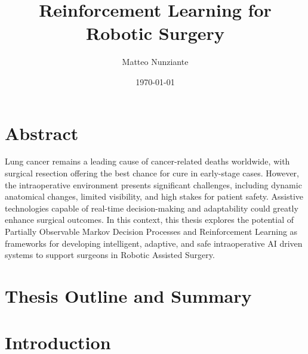 \documentclass[a4paper,11pt]{report}
\title{\textbf{Reinforcement Learning for Robotic Surgery}}
\author{Matteo Nunziante}
\date{\today}
\theoremstyle{definition}
\theoremstyle{plain}
\theoremstyle{remark}  %
\begin{document}
\setlength{\parindent}{0pt}

\maketitle

\chapter*{Abstract}
Lung cancer remains a leading cause of cancer-related deaths worldwide, with surgical
resection offering the best chance for cure in early-stage cases. However, the 
intraoperative environment presents significant challenges, including dynamic 
anatomical changes, limited visibility, and high stakes for patient safety. Assistive 
technologies capable of real-time decision-making and adaptability could greatly 
enhance surgical outcomes. In this context, this thesis explores the potential of 
Partially Observable Markov Decision Processes and Reinforcement Learning 
as frameworks for developing intelligent, adaptive, and safe intraoperative AI driven 
systems to support surgeons in Robotic Assisted Surgery.

\chapter*{Thesis Outline and Summary}
\tableofcontents
\clearpage
{} %
\listoffigures

\clearpage
{} %
\listoftables

\printglossary[type=\acronymtype]

\clearpage
{} %
\chapter{Introduction}
\end{document}
